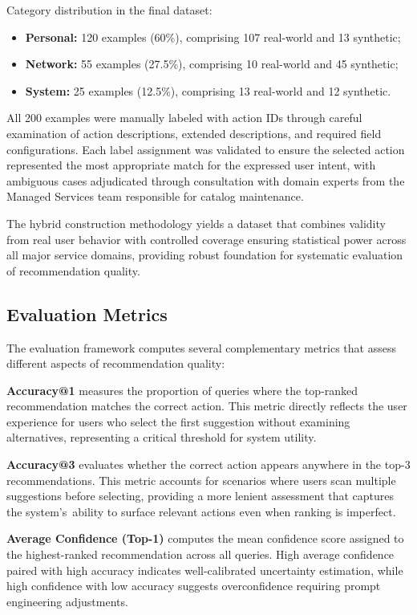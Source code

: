 Category distribution in the final dataset:
\begin{itemize}
    \item \textbf{Personal:} 120 examples (60\%), comprising 107 real-world and 13 synthetic;
    \item \textbf{Network:} 55 examples (27.5\%), comprising 10 real-world and 45 synthetic;
    \item \textbf{System:} 25 examples (12.5\%), comprising 13 real-world and 12 synthetic.
\end{itemize}

All 200 examples were manually labeled with action IDs through careful examination of action descriptions, extended descriptions, and required field configurations. Each label assignment was validated to ensure the selected action represented the most appropriate match for the expressed user intent, with ambiguous cases adjudicated through consultation with domain experts from the Managed Services team responsible for catalog maintenance.

The hybrid construction methodology yields a dataset that combines validity from real user behavior with controlled coverage ensuring statistical power across all major service domains, providing robust foundation for systematic evaluation of recommendation quality.

\subsection{Evaluation Metrics}

The evaluation framework computes several complementary metrics that assess different aspects of recommendation quality:

\textbf{Accuracy@1} measures the proportion of queries where the top-ranked recommendation matches the correct action. This metric directly reflects the user experience for users who select the first suggestion without examining alternatives, representing a critical threshold for system utility.

\textbf{Accuracy@3} evaluates whether the correct action appears anywhere in the top-3 recommendations. This metric accounts for scenarios where users scan multiple suggestions before selecting, providing a more lenient assessment that captures the system's~ability to surface relevant actions even when ranking is imperfect.

\textbf{Average Confidence (Top-1)} computes the mean confidence score assigned to the highest-ranked recommendation across all queries. High average confidence paired with high accuracy indicates well-calibrated uncertainty estimation, while high confidence with low accuracy suggests overconfidence requiring prompt engineering adjustments.

